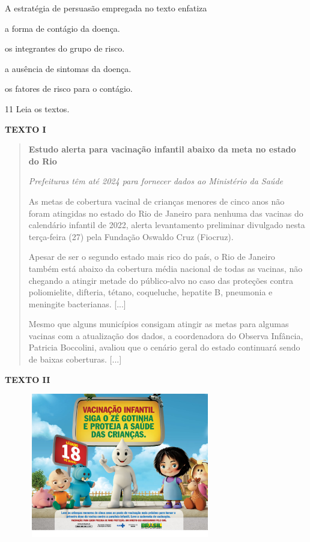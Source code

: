 A estratégia de persuasão empregada no texto enfatiza

\begin{escolha}
\item
  a forma de contágio da doença.
\item
  os integrantes do grupo de risco.
\item
  a ausência de sintomas da doença.
\item
  os fatores de risco para o contágio.
\end{escolha}

\num{11} Leia os textos.

\textbf{TEXTO I}

\begin{quote}
\centering\textbf{Estudo alerta para vacinação infantil abaixo da meta no estado
do Rio}

\emph{Prefeituras têm até 2024 para fornecer dados ao Ministério da Saúde}

As metas de cobertura vacinal de crianças menores de cinco anos não
foram atingidas no estado do Rio de Janeiro para nenhuma das vacinas do
calendário infantil de 2022, alerta levantamento preliminar divulgado
nesta terça-feira (27) pela Fundação Oswaldo Cruz (Fiocruz).

Apesar de ser o segundo estado mais rico do país, o Rio de Janeiro
também está abaixo da cobertura média nacional de todas as vacinas, não
chegando a atingir metade do público-alvo no caso das proteções contra
poliomielite, difteria, tétano, coqueluche, hepatite B, pneumonia e
meningite bacterianas. {[}...{]}

Mesmo que alguns municípios consigam atingir as metas para algumas
vacinas com a atualização dos dados, a coordenadora do Observa Infância,
Patricia Boccolini, avaliou que o cenário geral do estado continuará
sendo de baixas coberturas. {[}...{]}

\end{quote}


\textbf{TEXTO II}

\begin{figure}[H]
\centering
\includegraphics[width=3.15625in,height=2.48418in]{./imgSAEB_8_POR/media/image32.png}
\end{figure}



